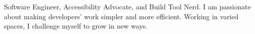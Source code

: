 \parbox {\textwidth} {
    Software Engineer, Accessibility Advocate, and Build Tool Nerd. I am passionate about making developers' work simpler and more efficient. Working in varied spaces, I challenge myself to grow in new ways.
}%
